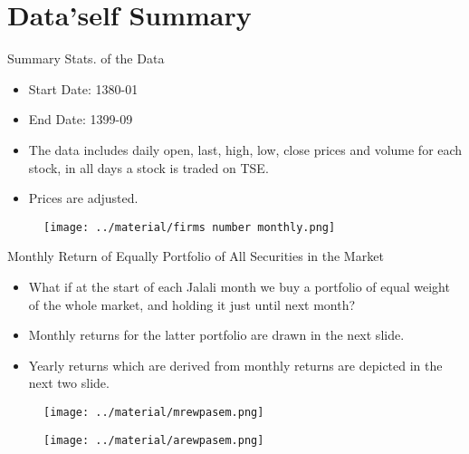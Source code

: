 \documentclass[aspectratio=169]{beamer}
\begin{document}
\section{Data'self Summary}
	\begin{frame}{Summary Stats. of the Data}
		\begin{itemize}
			\item Start Date: 1380-01
			\item End Date: 1399-09
			\item The data includes daily open, last, high, low, close prices and volume for each stock, in all days a stock is traded on TSE.
			\item Prices are adjusted.
		\end{itemize}
	\end{frame}

	\begin{frame}
		\begin{figure}
			\texttt{[image: ../material/firms number monthly.png]}
		\end{figure}
	\end{frame}


	\begin{frame}{Monthly Return of Equally Portfolio of All Securities in the Market}
		\begin{itemize}
			\item What if at the start of each Jalali month we buy a portfolio of equal weight of the whole market, and holding it just until next month?
			\item Monthly returns for the latter portfolio are drawn in the next slide.
			\item Yearly returns which are derived from monthly returns are depicted in the next two slide.
		\end{itemize}
	\end{frame}


	\begin{frame}
		\begin{figure}
			\texttt{[image: ../material/mrewpasem.png]}
		\end{figure}
	\end{frame}



	\begin{frame}
		\begin{figure}
			\texttt{[image: ../material/arewpasem.png]}
		\end{figure}
	\end{frame}
\end{document}
